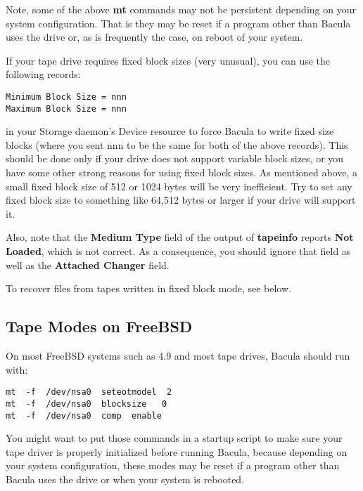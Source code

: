 Note, some of the above {\bf mt} commands may not be persistent depending
on your system configuration. That is they may be reset if a program
other than Bacula uses the drive or, as is frequently the case, on reboot
of your system.

If your tape drive requires fixed block sizes (very unusual), you can use the
following records:

\footnotesize
\begin{verbatim}
Minimum Block Size = nnn
Maximum Block Size = nnn
\end{verbatim}
\normalsize

in your Storage daemon's Device resource to force Bacula to write fixed size
blocks (where you sent nnn to be the same for both of the above records). This
should be done only if your drive does not support variable block sizes, or
you have some other strong reasons for using fixed block sizes. As mentioned
above, a small fixed block size of 512 or 1024 bytes will be very inefficient.
Try to set any fixed block size to something like 64,512 bytes or larger if
your drive will support it.

Also, note that the {\bf Medium Type} field of the output of {\bf tapeinfo}
reports {\bf Not Loaded}, which is not correct. As a consequence, you should
ignore that field as well as the {\bf Attached Changer} field.

To recover files from tapes written in fixed block mode, see below.
\label{FreeBSDTapes}

\subsection{Tape Modes on FreeBSD}

On most FreeBSD systems such as 4.9 and most tape drives, Bacula should run
with:

\footnotesize
\begin{verbatim}
mt  -f  /dev/nsa0  seteotmodel  2
mt  -f  /dev/nsa0  blocksize   0
mt  -f  /dev/nsa0  comp  enable
\end{verbatim}
\normalsize

You might want to put those commands in a startup script to make sure your
tape driver is properly initialized before running Bacula, because
depending on your system configuration, these modes may be reset if a
program other than Bacula uses the drive or when your system is rebooted.

